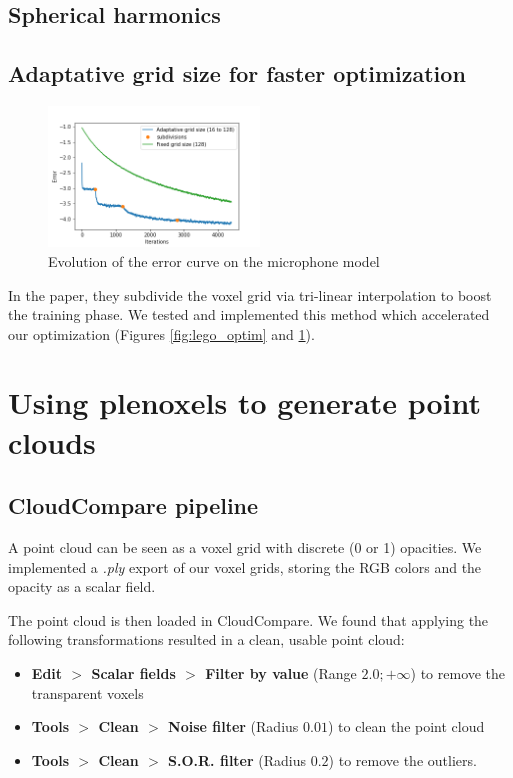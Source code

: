 \documentclass{article}
\begin{document}
\subsection{Spherical harmonics}

\subsection{Adaptative grid size for faster optimization}


\begin{figure}[!h]
\centering
\includegraphics[width=0.5\textwidth]{figs/training_mic.png}
\caption{\label{fig:subd} Evolution of the error curve on the microphone model}
\end{figure}

In the paper, they subdivide the voxel grid via tri-linear interpolation to boost the training phase. We tested and implemented this method which accelerated our optimization (Figures \ref{fig:lego_optim} and \ref{fig:subd}).


\section{Using plenoxels to generate point clouds}

\subsection{CloudCompare pipeline}

A point cloud can be seen as a voxel grid with discrete (0 or 1) opacities. We implemented a \textit{.ply} export of our voxel grids, storing the RGB colors and the opacity as a scalar field. 

The point cloud is then loaded in CloudCompare. We found that applying the following transformations resulted in a clean, usable point cloud:

\begin{itemize}
\item \textbf{Edit $>$ Scalar fields $>$ Filter by value} (Range $2.0; +\infty$) to remove the transparent voxels
\item \textbf{Tools $>$ Clean $>$ Noise filter} (Radius $0.01$) to clean the point cloud
\item \textbf{Tools $>$ Clean $>$ S.O.R. filter} (Radius $0.2$) to remove the outliers.
\end{itemize}
\end{document}
